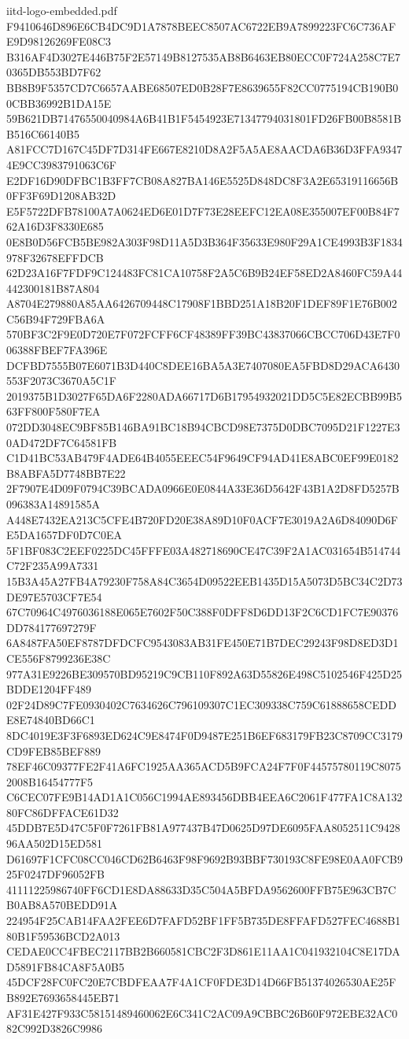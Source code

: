 \begin{filecontents*}[overwrite]{iitd-logo-embedded.pdf}
F9410646D896E6CB4DC9D1A7878BEEC8507AC6722EB9A7899223FC6C736AFE9D98126269FE08C3
B316AF4D3027E446B75F2E57149B8127535AB8B6463EB80ECC0F724A258C7E70365DB553BD7F62
BB8B9F5357CD7C6657AABE68507ED0B28F7E8639655F82CC0775194CB190B00CBB36992B1DA15E
59B621DB71476550040984A6B41B1F5454923E71347794031801FD26FB00B8581BB516C66140B5
A81FCC7D167C45DF7D314FE667E8210D8A2F5A5AE8AACDA6B36D3FFA93474E9CC3983791063C6F
E2DF16D90DFBC1B3FF7CB08A827BA146E5525D848DC8F3A2E65319116656B0FF3F69D1208AB32D
E5F5722DFB78100A7A0624ED6E01D7F73E28EEFC12EA08E355007EF00B84F762A16D3F8330E685
0E8B0D56FCB5BE982A303F98D11A5D3B364F35633E980F29A1CE4993B3F1834978F32678EFFDCB
62D23A16F7FDF9C124483FC81CA10758F2A5C6B9B24EF58ED2A8460FC59A44442300181B87A804
A8704E279880A85AA6426709448C17908F1BBD251A18B20F1DEF89F1E76B002C56B94F729FBA6A
570BF3C2F9E0D720E7F072FCFF6CF48389FF39BC43837066CBCC706D43E7F006388FBEF7FA396E
DCFBD7555B07E6071B3D440C8DEE16BA5A3E7407080EA5FBD8D29ACA6430553F2073C3670A5C1F
2019375B1D3027F65DA6F2280ADA66717D6B17954932021DD5C5E82ECBB99B563FF800F580F7EA
072DD3048EC9BF85B146BA91BC18B94CBCD98E7375D0DBC7095D21F1227E30AD472DF7C64581FB
C1D41BC53AB479F4ADE64B4055EEEC54F9649CF94AD41E8ABC0EF99E0182B8ABFA5D7748BB7E22
2F7907E4D09F0794C39BCADA0966E0E0844A33E36D5642F43B1A2D8FD5257B096383A14891585A
A448E7432EA213C5CFE4B720FD20E38A89D10F0ACF7E3019A2A6D84090D6FE5DA1657DF0D7C0EA
5F1BF083C2EEF0225DC45FFFE03A482718690CE47C39F2A1AC031654B514744C72F235A99A7331
15B3A45A27FB4A79230F758A84C3654D09522EEB1435D15A5073D5BC34C2D73DE97E5703CF7E54
67C70964C4976036188E065E7602F50C388F0DFF8D6DD13F2C6CD1FC7E90376DD784177697279F
6A8487FA50EF8787DFDCFC9543083AB31FE450E71B7DEC29243F98D8ED3D1CE556F8799236E38C
977A31E9226BE309570BD95219C9CB110F892A63D55826E498C5102546F425D25BDDE1204FF489
02F24D89C7FE0930402C7634626C796109307C1EC309338C759C61888658CEDDE8E74840BD66C1
8DC4019E3F3F6893ED624C9E8474F0D9487E251B6EF683179FB23C8709CC3179CD9FEB85BEF889
78EF46C09377FE2F41A6FC1925AA365ACD5B9FCA24F7F0F44575780119C80752008B16454777F5
C6CEC07FE9B14AD1A1C056C1994AE893456DBB4EEA6C2061F477FA1C8A13280FC86DFFACE61D32
45DDB7E5D47C5F0F7261FB81A977437B47D0625D97DE6095FAA8052511C942896AA502D15ED581
D61697F1CFC08CC046CD62B6463F98F9692B93BBF730193C8FE98E0AA0FCB925F0247DF96052FB
41111225986740FF6CD1E8DA88633D35C504A5BFDA9562600FFB75E963CB7CB0AB8A570BEDD91A
224954F25CAB14FAA2FEE6D7FAFD52BF1FF5B735DE8FFAFD527FEC4688B180B1F59536BCD2A013
CEDAE0CC4FBEC2117BB2B660581CBC2F3D861E11AA1C041932104C8E17DAD5891FB84CA8F5A0B5
45DCF28FC0FC20E7CBDFEAA7F4A1CF0FDE3D14D66FB51374026530AE25FB892E7693658445EB71
AF31E427F933C58151489460062E6C341C2AC09A9CBBC26B60F972EBE32AC082C992D3826C9986

\end{filecontents*}
